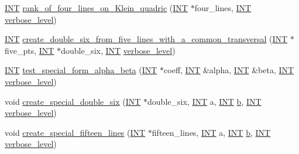 \begin{DoxyCompactItemize}
\item 
\mbox{\hyperlink{galois_8h_a09fddde158a3a20bd2dcadb609de11dc}{I\+NT}} \mbox{\hyperlink{classsurface_a2b9332dcfebfb4be2cdea56cebd1639d}{rank\+\_\+of\+\_\+four\+\_\+lines\+\_\+on\+\_\+\+Klein\+\_\+quadric}} (\mbox{\hyperlink{galois_8h_a09fddde158a3a20bd2dcadb609de11dc}{I\+NT}} $\ast$four\+\_\+lines, \mbox{\hyperlink{galois_8h_a09fddde158a3a20bd2dcadb609de11dc}{I\+NT}} \mbox{\hyperlink{simeon_8_c_a818073fbcc2f439e7c56952f67386122}{verbose\+\_\+level}})
\item 
\mbox{\hyperlink{galois_8h_a09fddde158a3a20bd2dcadb609de11dc}{I\+NT}} \mbox{\hyperlink{classsurface_a6d8fafa386893521305e016011d55673}{create\+\_\+double\+\_\+six\+\_\+from\+\_\+five\+\_\+lines\+\_\+with\+\_\+a\+\_\+common\+\_\+transversal}} (\mbox{\hyperlink{galois_8h_a09fddde158a3a20bd2dcadb609de11dc}{I\+NT}} $\ast$five\+\_\+pts, \mbox{\hyperlink{galois_8h_a09fddde158a3a20bd2dcadb609de11dc}{I\+NT}} $\ast$double\+\_\+six, \mbox{\hyperlink{galois_8h_a09fddde158a3a20bd2dcadb609de11dc}{I\+NT}} \mbox{\hyperlink{simeon_8_c_a818073fbcc2f439e7c56952f67386122}{verbose\+\_\+level}})
\item 
\mbox{\hyperlink{galois_8h_a09fddde158a3a20bd2dcadb609de11dc}{I\+NT}} \mbox{\hyperlink{classsurface_a21334591495270e78a3b248ada1fe8ff}{test\+\_\+special\+\_\+form\+\_\+alpha\+\_\+beta}} (\mbox{\hyperlink{galois_8h_a09fddde158a3a20bd2dcadb609de11dc}{I\+NT}} $\ast$coeff, \mbox{\hyperlink{galois_8h_a09fddde158a3a20bd2dcadb609de11dc}{I\+NT}} \&alpha, \mbox{\hyperlink{galois_8h_a09fddde158a3a20bd2dcadb609de11dc}{I\+NT}} \&beta, \mbox{\hyperlink{galois_8h_a09fddde158a3a20bd2dcadb609de11dc}{I\+NT}} \mbox{\hyperlink{simeon_8_c_a818073fbcc2f439e7c56952f67386122}{verbose\+\_\+level}})
\item 
void \mbox{\hyperlink{classsurface_a3b0ad8a2c8ee8bebc531782c56161985}{create\+\_\+special\+\_\+double\+\_\+six}} (\mbox{\hyperlink{galois_8h_a09fddde158a3a20bd2dcadb609de11dc}{I\+NT}} $\ast$double\+\_\+six, \mbox{\hyperlink{galois_8h_a09fddde158a3a20bd2dcadb609de11dc}{I\+NT}} a, \mbox{\hyperlink{galois_8h_a09fddde158a3a20bd2dcadb609de11dc}{I\+NT}} \mbox{\hyperlink{alphabet2_8_c_a148e3876077787926724625411d6e7a9}{b}}, \mbox{\hyperlink{galois_8h_a09fddde158a3a20bd2dcadb609de11dc}{I\+NT}} \mbox{\hyperlink{simeon_8_c_a818073fbcc2f439e7c56952f67386122}{verbose\+\_\+level}})
\item 
void \mbox{\hyperlink{classsurface_a8017b4bd4b6558b80689021b146ae32f}{create\+\_\+special\+\_\+fifteen\+\_\+lines}} (\mbox{\hyperlink{galois_8h_a09fddde158a3a20bd2dcadb609de11dc}{I\+NT}} $\ast$fifteen\+\_\+lines, \mbox{\hyperlink{galois_8h_a09fddde158a3a20bd2dcadb609de11dc}{I\+NT}} a, \mbox{\hyperlink{galois_8h_a09fddde158a3a20bd2dcadb609de11dc}{I\+NT}} \mbox{\hyperlink{alphabet2_8_c_a148e3876077787926724625411d6e7a9}{b}}, \mbox{\hyperlink{galois_8h_a09fddde158a3a20bd2dcadb609de11dc}{I\+NT}} \mbox{\hyperlink{simeon_8_c_a818073fbcc2f439e7c56952f67386122}{verbose\+\_\+level}})

\end{DoxyCompactItemize}

